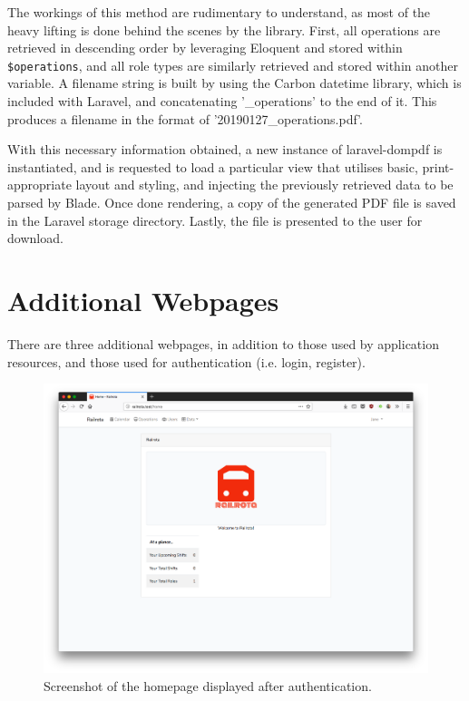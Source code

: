 The workings of this method are rudimentary to understand, as most of the heavy lifting is done behind the scenes by the library. First, all operations are retrieved in descending order by leveraging Eloquent and stored within \texttt{\$operations}, and all role types are similarly retrieved and stored within another variable. A filename string is built by using the Carbon datetime library, which is included with Laravel, and concatenating '\_operations' to the end of it. This produces a filename in the format of '20190127\_operations.pdf'.

With this necessary information obtained, a new instance of laravel-dompdf is instantiated, and is requested to load a particular view that utilises basic, print-appropriate layout and styling, and injecting the previously retrieved data to be parsed by Blade. Once done rendering, a copy of the generated PDF file is saved in the Laravel storage directory. Lastly, the file is presented to the user for download.

\section{Additional Webpages}
There are three additional webpages, in addition to those used by application resources, and those used for authentication (i.e. login, register).

\begin{figure}[!ht]
    \centering
    \includegraphics[width=1.0\textwidth]{Figures/screenshot-homepage}
    \caption{Screenshot of the homepage displayed after authentication.}
    \label{fig:homepage}
\end{figure}

